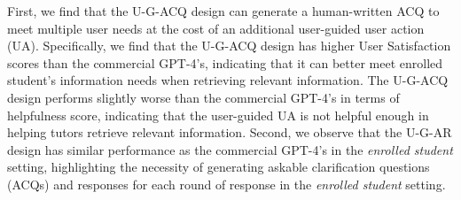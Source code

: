 First, we find that the U-G-ACQ design can generate a human-written ACQ to meet multiple user needs at the cost of an additional user-guided user action (UA).
Specifically, we find that the U-G-ACQ design has higher User Satisfaction scores than the commercial GPT-4's, indicating that it can better meet enrolled student's information needs when retrieving relevant information.
The U-G-ACQ design performs slightly worse than the commercial GPT-4's in terms of helpfulness score, indicating that the user-guided UA is not helpful enough in helping tutors retrieve relevant information.
Second, we observe that the U-G-AR design has similar performance as the commercial GPT-4's in the \textit{enrolled student} setting, highlighting the necessity of generating askable clarification questions (ACQs) and responses for each round of response in the \textit{enrolled student} setting.



